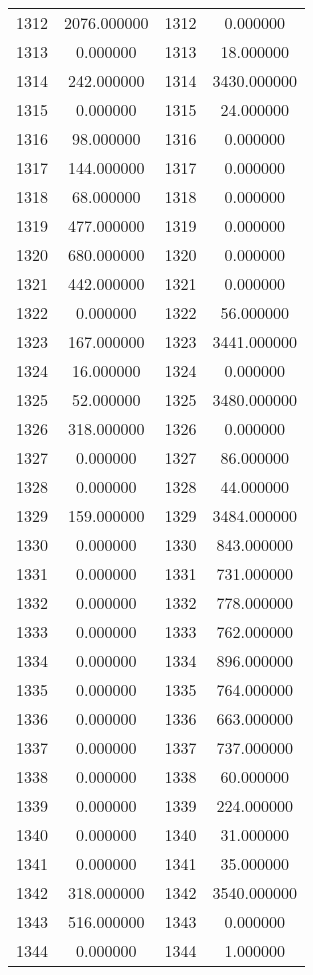 \documentclass[12pt]{article}
\begin{document}
\begin{longtable}{@{}cccc@{}}
1312 & 2076.000000 & 1312 & 0.000000 \\
1313 & 0.000000 & 1313 & 18.000000 \\
1314 & 242.000000 & 1314 & 3430.000000 \\
1315 & 0.000000 & 1315 & 24.000000 \\
1316 & 98.000000 & 1316 & 0.000000 \\
1317 & 144.000000 & 1317 & 0.000000 \\
1318 & 68.000000 & 1318 & 0.000000 \\
1319 & 477.000000 & 1319 & 0.000000 \\
1320 & 680.000000 & 1320 & 0.000000 \\
1321 & 442.000000 & 1321 & 0.000000 \\
1322 & 0.000000 & 1322 & 56.000000 \\
1323 & 167.000000 & 1323 & 3441.000000 \\
1324 & 16.000000 & 1324 & 0.000000 \\
1325 & 52.000000 & 1325 & 3480.000000 \\
1326 & 318.000000 & 1326 & 0.000000 \\
1327 & 0.000000 & 1327 & 86.000000 \\
1328 & 0.000000 & 1328 & 44.000000 \\
1329 & 159.000000 & 1329 & 3484.000000 \\
1330 & 0.000000 & 1330 & 843.000000 \\
1331 & 0.000000 & 1331 & 731.000000 \\
1332 & 0.000000 & 1332 & 778.000000 \\
1333 & 0.000000 & 1333 & 762.000000 \\
1334 & 0.000000 & 1334 & 896.000000 \\
1335 & 0.000000 & 1335 & 764.000000 \\
1336 & 0.000000 & 1336 & 663.000000 \\
1337 & 0.000000 & 1337 & 737.000000 \\
1338 & 0.000000 & 1338 & 60.000000 \\
1339 & 0.000000 & 1339 & 224.000000 \\
1340 & 0.000000 & 1340 & 31.000000 \\
1341 & 0.000000 & 1341 & 35.000000 \\
1342 & 318.000000 & 1342 & 3540.000000 \\
1343 & 516.000000 & 1343 & 0.000000 \\
1344 & 0.000000 & 1344 & 1.000000 \\

\end{longtable}
\end{document}
